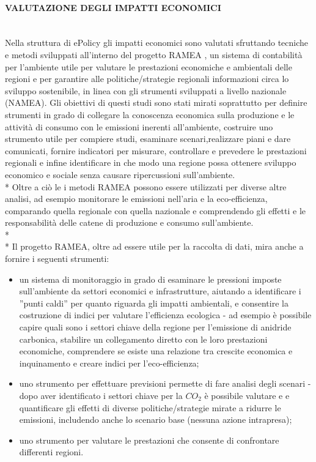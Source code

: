 \documentclass[12pt,a4paper,openright,twoside]{report}
\newcommand{\myparagraph}[1]{\paragraph{#1}\mbox{}\\}
\begin{document}
\myparagraph{VALUTAZIONE DEGLI IMPATTI ECONOMICI}
Nella struttura di ePolicy gli impatti economici sono valutati sfruttando tecniche e metodi sviluppati all'interno del progetto RAMEA \cite{ramea}, un sistema di contabilità per l'ambiente utile per valutare le prestazioni economiche e ambientali delle regioni e per garantire alle politiche/strategie regionali informazioni circa lo sviluppo sostenibile, in linea con gli strumenti sviluppati a livello nazionale (NAMEA). Gli obiettivi di questi studi sono stati mirati soprattutto per definire strumenti in grado di collegare la conoscenza economica sulla produzione e le attività di consumo con le emissioni inerenti all'ambiente, costruire uno strumento utile per compiere studi, esaminare scenari,realizzare piani e dare comunicati, fornire indicatori per misurare, controllare e prevedere le prestazioni regionali e infine identificare in che modo una regione possa ottenere sviluppo economico e sociale senza causare ripercussioni sull'ambiente.\\*
Oltre a ciò le i metodi RAMEA possono essere utilizzati per diverse altre analisi, ad esempio monitorare le emissioni nell'aria e la eco-efficienza, comparando quella regionale con quella nazionale e comprendendo gli effetti e le responsabilità delle catene di produzione e consumo sull'ambiente. \\*\\*
Il progetto RAMEA, oltre ad essere utile per la raccolta di dati, mira anche a fornire i seguenti strumenti:
\begin{itemize}
\item un sistema di monitoraggio in grado di esaminare le pressioni imposte sull'ambiente da settori economici e infrastrutture, aiutando a identificare i ''punti caldi'' per quanto riguarda gli impatti ambientali, e consentire la costruzione di indici per valutare l'efficienza ecologica - ad esempio è possibile capire quali sono i settori chiave della regione per l'emissione di anidride carbonica, stabilire un collegamento diretto con le loro prestazioni economiche, comprendere se esiste una relazione tra crescite economica e inquinamento e creare indici per l'eco-efficienza;
\item uno strumento per effettuare previsioni permette di fare analisi degli scenari - dopo aver identificato i settori chiave per la $CO_2$ è possibile valutare e e quantificare gli effetti di diverse politiche/strategie mirate a ridurre le emissioni, includendo anche lo scenario base (nessuna azione intrapresa);
\item uno strumento per valutare le prestazioni che consente di confrontare differenti regioni. 
\end{itemize}
 
\end{document}
